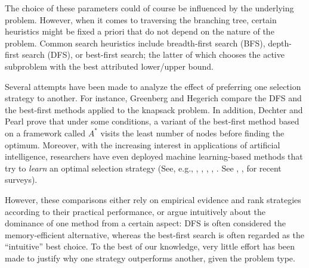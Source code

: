 \documentclass[moor,sglanonrev]{informs4}
\theoremstyle{plain}
\begin{document}
The choice of these parameters could of course be influenced by the underlying problem. However, when it comes to traversing the branching tree, certain heuristics might be fixed a priori that do not depend on the nature of the problem. Common search heuristics include breadth-first search (BFS), depth-first search (DFS), or best-first search; the latter of which chooses the active subproblem with the best attributed lower/upper bound. 

Several attempts have been made to analyze the effect of preferring one selection strategy to another. For instance, Greenberg and Hegerich \cite{greenberg_hegerich} compare the DFS and the best-first methods applied to the knapsack problem. In addition, Dechter and Pearl \cite{dechter} prove that under some conditions, a variant of the best-first method based on a framework called $A^*$ \cite{hart} visits the least number of nodes before finding the optimum. Moreover, with the increasing interest in applications of artificial intelligence, researchers have even deployed machine learning-based methods that try to \emph{learn} an optimal selection strategy (See, e.g., \cite{alvarez}, \cite{balcan}, \cite{gupta}, \cite{khalil}, \cite{gp_learning}. See \cite{bengio}, \cite{lodi}, \cite{scavuzzo24} for recent surveys). 

However, these comparisons either rely on empirical evidence and rank strategies according to their practical performance, or argue intuitively about the dominance of one method from a certain aspect: DFS is often considered the memory-efficient alternative, whereas the best-first search is often regarded as the ``intuitive'' best choice. To the best of our knowledge, very little effort has been made to justify why one strategy outperforms another, given the problem type.
\end{document}
